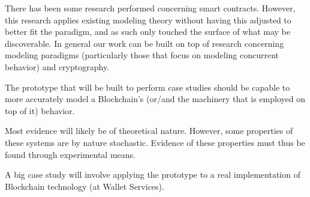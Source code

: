 \documentclass[]{article}
\begin{document}
There has been some research performed concerning smart contracts. However, this research applies existing modeling theory without having this adjusted to better fit the paradigm, and as such only touched the surface of what may be discoverable. In general our work can be built on top of research concerning modeling paradigms (particularly those that focus on modeling concurrent behavior) and cryptography.

The prototype that will be built to perform case studies should be capable to more accurately model a Blockchain's (or/and the machinery that is employed on top of it) behavior.

Most evidence will likely be of theoretical nature. However, some properties of these systems are by nature stochastic. Evidence of these properties must thus be found through experimental means.

A big case study will involve applying the prototype to a real implementation of Blockchain technology (at Wallet Services).
\end{document}
